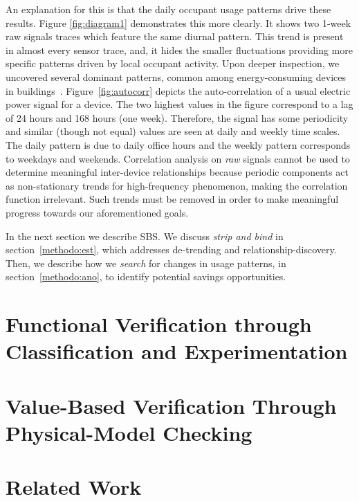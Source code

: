 An explanation for this is that the daily occupant usage patterns %
drive these results.
Figure \ref{fig:diagram1} demonstrates this more clearly.  It shows two 1-week raw signals traces which feature the same 
diurnal pattern.  
This trend is present in almost every sensor trace, and, it hides 
the smaller fluctuations providing more specific patterns driven by local occupant activity.  Upon deeper inspection, we uncovered several
 dominant patterns, common among energy-consuming devices in buildings~\cite{wrinch:pes2012}.  Figure~\ref{fig:autocorr} depicts the 
 auto-correlation of a usual electric power signal for a device.  The two highest values in the figure correspond to a lag of 24 hours and 168 hours (one week).  
 Therefore, the signal has some periodicity and similar (though not equal) values are seen at daily and weekly time scales.
The daily pattern is due to daily office hours and the weekly pattern corresponds to weekdays and weekends.  
Correlation analysis on \emph{raw} signals cannot be used to determine meaningful 
inter-device relationships because periodic components act as non-stationary trends for high-frequency phenomenon, 
 making the correlation function irrelevant.  %
Such trends must be removed in order to make meaningful progress towards our aforementioned goals.  

In the next section we describe SBS.  
We discuss \emph{strip and bind} in section~\ref{methodo:est}, which addresses de-trending and
relationship-discovery.  Then, we describe how we \emph{search} for changes in usage patterns, 
in section~\ref{methodo:ano}, to identify potential savings opportunities.








\section{Functional Verification through Classification and Experimentation}

\section{Value-Based Verification Through Physical-Model Checking}

\section{Related Work}

